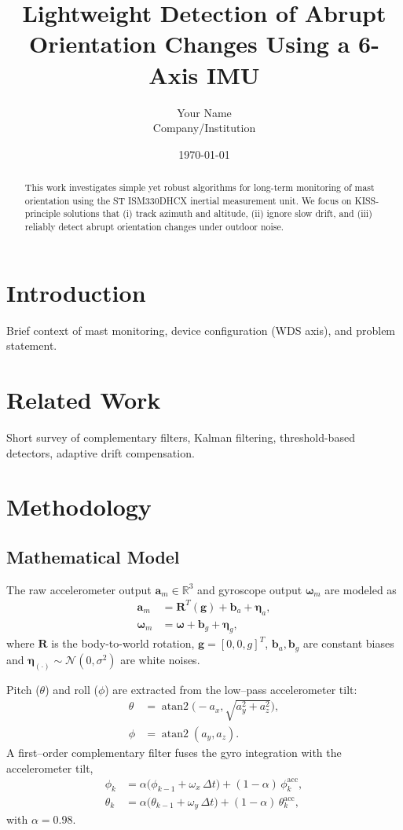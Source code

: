 \documentclass{article} %
\title{Lightweight Detection of Abrupt Orientation Changes Using a 6-Axis IMU}
\author{Your Name \\ Company/Institution}
\date{\today}
\begin{document}
\maketitle

\begin{abstract}
This work investigates simple yet robust algorithms for long-term monitoring of mast orientation using the ST ISM330DHCX inertial measurement unit. We focus on KISS-principle solutions that (i) track azimuth and altitude, (ii) ignore slow drift, and (iii) reliably detect abrupt orientation changes under outdoor noise.
\end{abstract}

\section{Introduction}
Brief context of mast monitoring, device configuration (WDS axis), and problem statement.

\section{Related Work}
Short survey of complementary filters, Kalman filtering, threshold-based detectors, adaptive drift compensation.

\section{Methodology}
\subsection{Mathematical Model}
The raw accelerometer output $\mathbf{a}_m\in\mathbb{R}^3$ and gyroscope output $\boldsymbol{\omega}_m$ are modeled as
\begin{align}
\mathbf{a}_m &= \mathbf{R}^T ( \mathbf{g} ) + \mathbf{b}_a + \boldsymbol{\eta}_a,\\
\boldsymbol{\omega}_m &= \boldsymbol{\omega} + \mathbf{b}_g + \boldsymbol{\eta}_g,
\end{align}
where $\mathbf{R}$ is the body-to-world rotation, $\mathbf{g}= [0,0,g]^T$, $\mathbf{b}_a,\mathbf{b}_g$ are constant biases and $\boldsymbol{\eta}_{(\cdot)}\sim\mathcal{N}(0,\sigma^2)$ are white noises.

Pitch ($\theta$) and roll ($\phi$) are extracted from the low–pass accelerometer tilt:
\begin{align}
\theta &= \operatorname{atan2}\!\bigl(-a_x,\sqrt{a_y^2+a_z^2}\bigr),\\
\phi &= \operatorname{atan2}(a_y,a_z).
\end{align}
A first–order complementary filter fuses the gyro integration with the accelerometer tilt,
\begin{align}
\phi_{k} &= \alpha \bigl( \phi_{k-1}+\omega_x\,\Delta t\bigr) + (1-\alpha)\,\phi^{\mathrm{acc}}_{k},\\
\theta_{k} &= \alpha \bigl( \theta_{k-1}+\omega_y\,\Delta t\bigr) + (1-\alpha)\,\theta^{\mathrm{acc}}_{k},
\end{align}
with $\alpha=0.98$.
\end{document}
